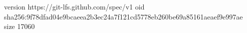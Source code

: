 version https://git-lfs.github.com/spec/v1
oid sha256:9f78dfad04e9bcaeea2b3ec24a7f121cd5778eb260be69a85161aeaef9e997ae
size 17060
